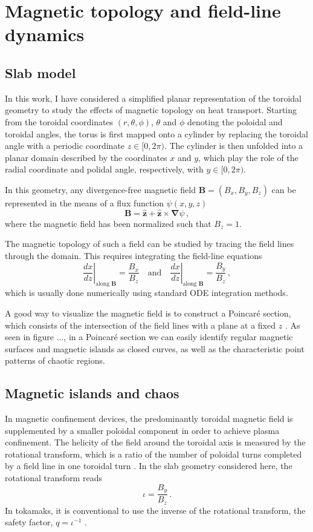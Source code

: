\section{Magnetic topology and field-line dynamics}
\subsection{Slab model}
In this work, I have considered a simplified planar representation of the toroidal geometry to study the effects of magnetic topology on heat transport. Starting from the toroidal coordinates $(r, \theta, \phi)$, $\theta$ and $\phi$ denoting the poloidal and toroidal angles, the torus is first mapped onto a cylinder by replacing the toroidal angle with a periodic coordinate $z\in[0,2\pi)$. The cylinder is then unfolded into a planar domain described by the coordinates $x$ and $y$, which play the role of the radial coordinate and polidal angle, respectively, with $y\in[0,2\pi)$.

In this geometry, any divergence-free magnetic field $\mathbf{B}=(B_x, B_y, B_z)$ can be represented in the means of a flux function $\psi(x,y,z)$
\begin{equation}\label{B}
	\mathbf{B}=\hat{\mathbf{z}}+\hat{\mathbf{z}}\times\boldsymbol{\nabla}\psi\,,
\end{equation}
where the magnetic field has been normalized such that $B_z=1$.

The magnetic topology of such a field can be studied by tracing the field lines through the domain. This requires integrating the field-line equations
\begin{equation}
    \left.\frac{dx}{dz}\right|_{\text{along }\mathbf{B}}=\frac{B_x}{B_z}\quad\text{and}\quad \left.\frac{dx}{dz}\right|_{\text{along }\mathbf{B}}=\frac{B_y}{B_z}\,,
\end{equation} 
which is usually done numerically using standard ODE integration methods.

A good way to visualize the magnetic field is to construct a Poincaré section, which consists of the intersection of the field lines with a plane at a fixed $z$ \cite{}. As seen in figure ..., in a Poincaré section we can easily identify regular magnetic surfaces and magnetic islands as closed curves, as well as the characteristic point patterns of chaotic regions.

\subsection{Magnetic islands and chaos}
In magnetic confinement devices, the predominantly toroidal magnetic field is supplemented by a smaller poloidal component in order to achieve plasma confinement. The helicity of the field around the toroidal axis is measured by the rotational transform, which is a ratio of the number of poloidal turns completed by a field line in one toroidal turn \cite{}. In the slab geometry considered here, the rotational transform reads
\begin{equation} \label{iota}
    \iota = \frac{B_y}{B_z}\,.
\end{equation}
In tokamaks, it is conventional to use the inverse of the rotational transform, the safety factor, $q=\iota^{-1}$ \cite{}.

